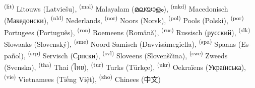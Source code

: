 \documentclass[onecolumn,a4paper,10pt]{report}
\begin{document}
\textsuperscript{(lit)}  Litouws (\foreignlanguage{lithuanian}{Latviešu}),
\textsuperscript{(mal)} Malayalam (\foreignlanguage{malayalam}{മലയാളം}),
\textsuperscript{(mkd)} Macedonisch (\foreignlanguage{macedonian}{Македонски}),
\textsuperscript{(nld)}  Nederlands,
\textsuperscript{(nor)}  Noors (\foreignlanguage{norwegian}{Norsk}),
\textsuperscript{(pol)}  Pools (\foreignlanguage{polish}{Polski}),
\textsuperscript{(por)}  Portugees (\foreignlanguage{portuguese}{Português}),
\textsuperscript{(ron)}  Roemeens (\foreignlanguage{romanian}{Română}),
\textsuperscript{(rus)}  Russisch (\foreignlanguage{russian}{русский}),
\textsuperscript{(slk)}  Slowaaks (\foreignlanguage{slovak}{Slovenský}),
\textsuperscript{(sme)} Noord-Samisch (\foreignlanguage{samin}{Davvisámegiella}),
\textsuperscript{(spa)}  Spaans (\foreignlanguage{spanish}{Español}),
\textsuperscript{(srp)}  Servisch (\foreignlanguage{serbian}{Српски}),
\textsuperscript{(svl)}  Sloveens (\foreignlanguage{slovenian}{Slovenščina}),
\textsuperscript{(swe)}  Zweeds (\foreignlanguage{swedish}{Svenska}),
\textsuperscript{(tha)}  Thai (\foreignlanguage{thai}{ไทย}),
\textsuperscript{(tur)}  Turks (\foreignlanguage{turkish}{Türkçe}),
\textsuperscript{(ukr)}  Oekraïens (\foreignlanguage{ukrainian}{Українська}),
\textsuperscript{(vie)}  Vietnamees (\foreignlanguage{vietnamese}{Tiếng Việt}),
\textsuperscript{(zho)}  Chinees (\foreignlanguage{chinese}{中文})

\newpage

\end{document}
